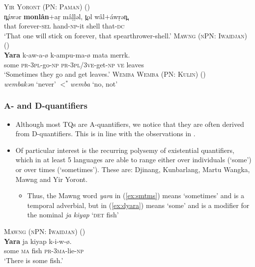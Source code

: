 \documentclass{article}
\begin{document}
\begin{exe}
  \ex\label{ex:4eva} \textsc{Yir Yoront (PN: Paman)} (\citealt[343]{alpher73})\\
  \gll n̪\'awər \textbf{monlån}$+$a\d{r} m\^a\d{l}\d{l}əl, t̪ol w\^al$+$\'aw\d{r}ən̪.\\
  that forever-\textsc{sel} hand-\textsc{np}-it shell that-\textsc{dc}\\
  \glt `That one will stick on forever, that spearthrower-shell.'
  \ex\label{ex:smtms} \textsc{Mawng (nPN: Iwaidjan)} (\citealt{ngaralk})\\
  \gll \textbf{Yara} k-aw-a-ø k-ampu-ma-ø mata merrk.\\
  some \textsc{pr-3pl}-go-\textsc{np} \textsc{pr-3pl/3ve}-get-\textsc{np} \textsc{ve} leaves\\
  \glt `Sometimes they go and get leaves.' %
  \ex\label{ex:never} \textsc{Wemba Wemba (PN: Kulin)} (\citealt[47]{hercus92})\\
  \textit{\charis wembakən} `never' $<^*$\textit{wemba} `no, not'
\end{exe}

\subsubsection{A- and D-quantifiers}
\label{sec:adqfrs}
\begin{itemize}
\item Although most TQs are A-quantifiers, we notice that they are often derived from D-quantifiers. This is in line with the observations in \citealt{gil93,keenanpaperno17ov}. %
\item Of particular interest is the recurring polysemy of existential quantifiers, which in at least 5 languages are able to range either over individuals (`some') or over times (`sometimes'). These are: Djinang, Kunbarlang, Martu Wangka, Mawng and Yir Yoront.
  \begin{itemize}
  \item Thus, the Mawng word \textit{yara} in (\ref{ex:smtms}) means `sometimes' and is a temporal adverbial, but in (\ref{ex:dyara}) means `some' and is a modifier for the nominal \textit{ja kiyap} `\textsc{det} fish'
  \end{itemize}
\end{itemize}
\begin{exe}
  \ex\label{ex:dyara} \textsc{Mawng (nPN: Iwaidjan)} (\citealt{ngaralk})\\
  \gll \textbf{Yara} ja kiyap k-i-w-ø.\\
  some \textsc{ma} fish \textsc{pr-3ma}-lie-\textsc{np}\\
  \glt `There is some fish.' %
\end{exe}
\end{document}

